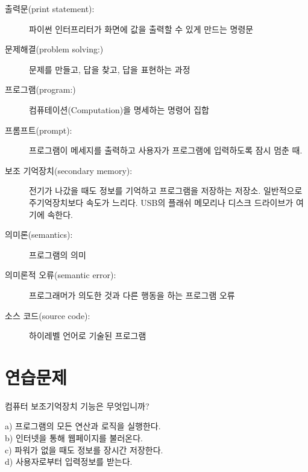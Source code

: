 \begin{description}
\item[출력문(print statement):] 파이썬 인터프리터가 화면에 값을 출력할 수 있게 만드는 명령문


\item[문제해결(problem solving:)] 문제를 만들고, 답을 찾고, 답을 표현하는 과정

\item[프로그램(program:)] 컴퓨테이션(Computation)을 명세하는 명령어 집합

\item[프롬프트(prompt):] 프로그램이 메세지를 출력하고 사용자가 프로그램에 입력하도록 잠시 멈춘 때.

\item[보조 기억장치(secondary memory):] 전기가 나갔을 때도 정보를 기억하고 프로그램을 저장하는 저장소. 
일반적으로 주기억장치보다 속도가 느리다. 
USB의 플래쉬 메모리나 디스크 드라이브가 여기에 속한다.

\item[의미론(semantics):]  프로그램의 의미

\item[의미론적 오류(semantic error):] 프로그래머가 의도한 것과 다른 행동을 하는 프로그램 오류

\item[소스 코드(source code):] 하이레벨 언어로 기술된 프로그램

\end{description}

\section{연습문제}


\begin{ex}
컴퓨터 보조기억장치 기능은 무엇입니까?

a) 프로그램의 모든 연산과 로직을 실행한다.\\
b) 인터넷을 통해 웹페이지를 불러온다.\\
c) 파워가 없을 때도 정보를 장시간 저장한다.\\
d) 사용자로부터 입력정보를 받는다.
\end{ex}

